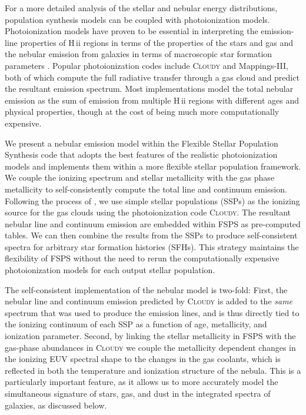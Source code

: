 \documentclass[twocolumn, tighten]{aastex61}
\newcommand{\FSPS}{{\sc FSPS}\xspace}
\newcommand{\Mappings}{{\sc Mappings-III}\xspace}
\newcommand{\Cloudy}{\textsc{Cloudy}\xspace}
\newcommand{\hii}{H\,{\sc ii}\xspace}
\begin{document}
For a more detailed analysis of the stellar and nebular energy distributions, population synthesis models can be coupled with photoionization models. Photoionization models have proven to be essential in interpreting the emission-line properties of \hii regions in terms of the properties of the stars and gas \citep[e.g.,][]{Dopita00} and the nebular emission from galaxies in terms of macroscopic star formation parameters \citep[e.g.,][]{Brinchmann04}. Popular photoionization codes include \Cloudy \citep{Ferland13} and \Mappings \citep{Groves04}, both of which compute the full radiative transfer through a gas cloud and predict the resultant emission spectrum. Most implementations model the total nebular emission as the sum of emission from multiple \hii regions with different ages and physical properties, though at the cost of being much more computationally expensive\citep[e.g.,][]{Kewley01, Moy01, CL01, Dopita06}.

We present a nebular emission model within the Flexible Stellar Population Synthesis code \citep[\FSPS\footnote{available on GitHub \url{https://github.com/cconroy20/fsps}},][]{Conroy09} that adopts the best features of the realistic photoionization models and implements them within a more flexible stellar population framework. We couple the ionizing spectrum and stellar metallicity with the gas phase metallicity to self-consistently compute the total line and continuum emission. Following the process of \citet{CL01}, we use simple stellar populations (SSPs) as the ionizing source for the gas clouds using the photoionization code \Cloudy. The resultant nebular line and continuum emission are embedded within \FSPS as pre-computed tables. We can then combine the results from the SSPs to produce self-consistent spectra for arbitrary star formation histories (SFHs). This strategy maintains the flexibility of \FSPS without the need to rerun the computationally expensive photoionization models for each output stellar population.

The self-consistent implementation of the nebular model is two-fold: First, the nebular line and continuum emission predicted by \Cloudy is added to the \emph{same} spectrum that was used to produce the emission lines, and is thus directly tied to the ionizing continuum of each SSP as a function of age, metallicity, and ionization parameter. Second, by linking the stellar metallicity in \FSPS with the gas-phase abundances in \Cloudy we couple the metallicity dependent changes in the ionizing EUV spectral shape to the changes in the gas coolants, which is reflected in both the temperature and ionization structure of the nebula. This is a particularly important feature, as it allows us to more accurately model the simultaneous signature of stars, gas, and dust in the integrated spectra of galaxies, as discussed below. 
\end{document}
